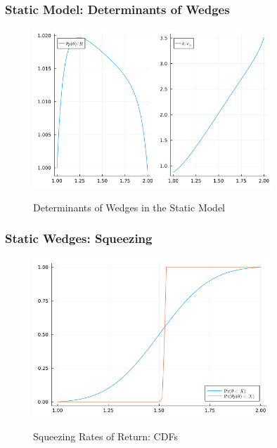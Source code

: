 \documentclass{beamer}
\begin{document}
\begin{frame}
    \frametitle{Static Model: Determinants of Wedges}

    \begin{figure}[htbp]
        \centering
        \caption{Determinants of Wedges in the Static Model}
        \includegraphics[width = 0.8\textwidth]{figures/static_determs.png}
        \label{fig:determs}
    \end{figure}
    

\end{frame}

\begin{frame}
    \frametitle{Static Wedges: Squeezing}

    \begin{figure}[htbp]
        \centering
        \caption{Squeezing Rates of Return: CDFs}
        \includegraphics[width = 0.8\textwidth]{figures/static_cdfs.png}
        \label{fig:squeeze}
    \end{figure}

\end{frame}
\end{document}

